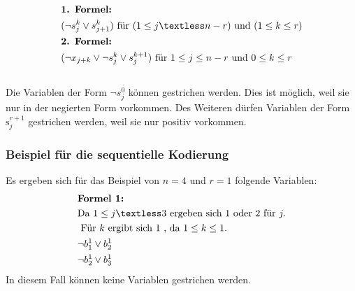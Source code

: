 \documentclass[a4,abstract=on]{scrartcl}
\begin{document}
\begin{align*}
&\textbf{1. Formel:}\\
&(\neg s_j^k \vee s_{j+1}^k) \text{ für } (1 \leq j \textless n - r) \text{ und } (1 \leq k \leq r)\\
&\textbf{2. Formel:}\\
&(\neg x_{j+k} \vee \neg s_j^k \vee s_j^{k+1}) \text{ für } 1 \leq j \leq n - r \text{ und } 0 \leq k \leq r\\
\end{align*}
\ \\
Die Variablen der Form  $\neg s_j^0$ können gestrichen werden. Dies ist möglich, weil sie nur in der negierten Form vorkommen. Des Weiteren dürfen Variablen der Form $\text{s}_j^{r+1}$ gestrichen werden, weil sie nur positiv vorkommen.

	\subsubsection*{Beispiel für die sequentielle Kodierung}
Es ergeben sich für das Beispiel von $n=4$ und $r=1$ folgende Variablen:\\

\begin{align*}
&\textbf{Formel 1:}\\
& \text{Da } 1 \leq j \textless 3 \text{ ergeben sich } 1 \text{ oder } 2 \text{ für } j.\\
&\text{ Für } k \text{ ergibt sich } 1 \text{ , da } 1 \leq k \leq 1.\\
&\neg b_1^1 \vee b_2^1\\
&\neg b_2^1 \vee b_3^1\\
\end{align*}
In diesem Fall können keine Variablen gestrichen werden.\\
\end{document}

